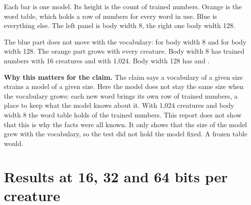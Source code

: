  Each bar is one model. Its height is the count of trained numbers. Orange is the
word table, which holds a row of  numbers for every word in use. Blue is everything
else. The left panel is body width 8, the right one body width 128.

 The blue part does not move with the vocabulary:  for
body width 8 and  for body width 128. The orange part grows
with every creature. Body width 8 has  trained numbers with 16
creatures and  with 1,024. Body width 128 has
 and .

\textbf{Why this matters for the claim.} The claim says a vocabulary of a given size strains a model
of a given size. Here the model does not stay the same size when the vocabulary grows: each new
word brings its own row of  trained numbers, a place to keep what the model knows about
it. With 1,024 creatures and body width 8 the word table holds 
of the  trained numbers. This report does not show that this
is why the facts were all known. It only shows that the size of the model grew with the
vocabulary, so the test did not hold the model fixed. A frozen table would.

\section{Results at 16, 32 and 64 bits per creature}\label{sec:bits}


